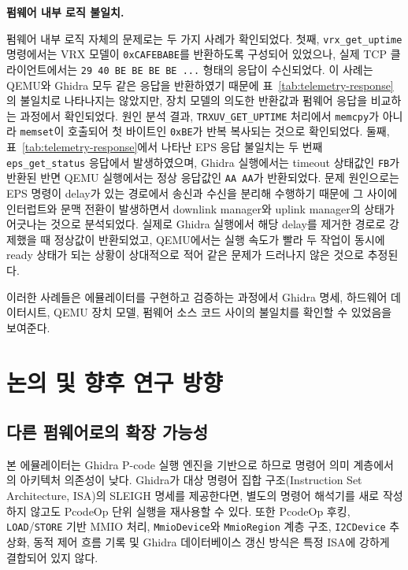 \documentclass[master,korean,final]{kaist-ucs}
\begin{document}
\noindent\textbf{펌웨어 내부 로직 불일치.}\par
펌웨어 내부 로직 자체의 문제로는 두 가지 사례가 확인되었다. 첫째, \texttt{vrx\_get\_uptime} 명령에서는 VRX 모델이 \texttt{0xCAFEBABE}를 반환하도록 구성되어 있었으나, 실제 TCP 클라이언트에서는 \texttt{29 40 BE BE BE BE ...} 형태의 응답이 수신되었다. 이 사례는 QEMU와 Ghidra 모두 같은 응답을 반환하였기 때문에 표~\ref{tab:telemetry-response}의 불일치로 나타나지는 않았지만, 장치 모델의 의도한 반환값과 펌웨어 응답을 비교하는 과정에서 확인되었다. 원인 분석 결과, \texttt{TRXUV\_GET\_UPTIME} 처리에서 \texttt{memcpy}가 아니라 \texttt{memset}이 호출되어 첫 바이트인 \texttt{0xBE}가 반복 복사되는 것으로 확인되었다. 둘째, 표~\ref{tab:telemetry-response}에서 나타난 EPS 응답 불일치는 두 번째 \texttt{eps\_get\_status} 응답에서 발생하였으며, Ghidra 실행에서는 timeout 상태값인 \texttt{FB}가 반환된 반면 QEMU 실행에서는 정상 응답값인 \texttt{AA AA}가 반환되었다. 문제 원인으로는 EPS 명령이 delay가 있는 경로에서 송신과 수신을 분리해 수행하기 때문에 그 사이에 인터럽트와 문맥 전환이 발생하면서 downlink manager와 uplink manager의 상태가 어긋나는 것으로 분석되었다. 실제로 Ghidra 실행에서 해당 delay를 제거한 경로로 강제했을 때 정상값이 반환되었고, QEMU에서는 실행 속도가 빨라 두 작업이 동시에 ready 상태가 되는 상황이 상대적으로 적어 같은 문제가 드러나지 않은 것으로 추정된다.

이러한 사례들은 에뮬레이터를 구현하고 검증하는 과정에서 Ghidra 명세, 하드웨어 데이터시트, QEMU 장치 모델, 펌웨어 소스 코드 사이의 불일치를 확인할 수 있었음을 보여준다.

\chapter{논의 및 향후 연구 방향}

\section{다른 펌웨어로의 확장 가능성}

본 에뮬레이터는 Ghidra P-code 실행 엔진을 기반으로 하므로 명령어 의미 계층에서의 아키텍처 의존성이 낮다. Ghidra가 대상 명령어 집합 구조(Instruction Set Architecture, ISA)의 SLEIGH 명세를 제공한다면, 별도의 명령어 해석기를 새로 작성하지 않고도 PcodeOp 단위 실행을 재사용할 수 있다. 또한 PcodeOp 후킹, \texttt{LOAD}/\texttt{STORE} 기반 MMIO 처리, \texttt{MmioDevice}와 \texttt{MmioRegion} 계층 구조, \texttt{I2CDevice} 추상화, 동적 제어 흐름 기록 및 Ghidra 데이터베이스 갱신 방식은 특정 ISA에 강하게 결합되어 있지 않다.
\end{document}
